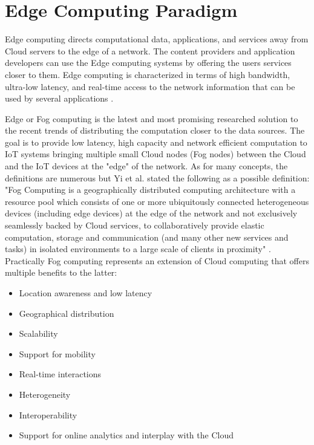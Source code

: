 
\section{Edge Computing Paradigm}
\label{Edge}
Edge computing directs computational data, applications, and services away from Cloud servers to the edge of a network. The content providers and application developers can use the Edge computing systems by offering the users services closer to them. Edge computing is characterized in terms of high bandwidth, ultra-low latency, and real-time access to the network information that can be used by several applications \cite{khan2019edge}.

Edge or Fog computing is the latest and most promising researched solution to the recent trends of distributing the computation closer to the data sources. The goal is to provide low latency, high capacity and network efficient computation to IoT systems bringing multiple small Cloud nodes (Fog nodes) between the Cloud and the IoT devices at the "edge" of the network. As for many concepts, the definitions are numerous \cite{sahni2018data} but Yi et al. stated the following as a possible definition: "Fog Computing is a geographically distributed computing architecture with a resource pool which consists of one or more ubiquitously connected heterogeneous devices (including edge devices) at the edge of the network and not exclusively seamlessly backed by Cloud services, to collaboratively provide elastic computation, storage and communication (and many other new services and tasks) in isolated environments to a large scale of clients in proximity" \cite{yi2015fog}.
Practically Fog computing represents an extension of Cloud computing that offers multiple benefits to the latter:

\begin{itemize}
    \item Location awareness and low latency
    \item Geographical distribution
    \item Scalability
    \item Support for mobility
    \item Real-time interactions
    \item Heterogeneity
    \item Interoperability
    \item Support for online analytics and interplay with the Cloud
\end{itemize}


